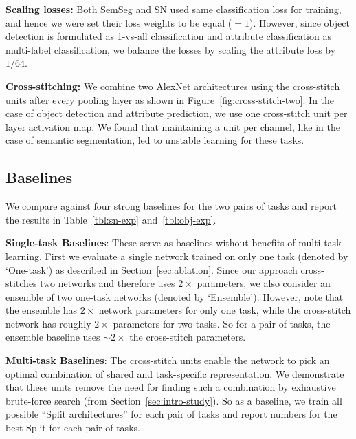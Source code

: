 \documentclass[10pt,twocolumn,letterpaper]{article}
\begin{document}
\par \noindent \textbf{Scaling losses:} Both SemSeg and SN used same classification loss for training, and hence we were set their loss weights to be equal ($=1$). However, since object detection is formulated as 1-vs-all classification and attribute classification as multi-label classification, we balance the losses by scaling the attribute loss by $1/64$. 


\par \noindent \textbf{Cross-stitching:} We combine two AlexNet architectures using the cross-stitch units after every pooling layer as shown in Figure~\ref{fig:cross-stitch-two}. In the case of object detection and attribute prediction, we use one cross-stitch unit per layer activation map. We found that maintaining a unit per channel, like in the case of semantic segmentation, led to unstable learning for these tasks. 

\subsection{Baselines}
We compare against four strong baselines for the two pairs of tasks and report the results in Table~\ref{tbl:sn-exp} and~\ref{tbl:obj-exp}.

\par \noindent \textbf{Single-task Baselines}: These serve as baselines without benefits of multi-task learning. First we evaluate a single network trained on only one task (denoted by `One-task') as described in Section~\ref{sec:ablation}. Since our approach cross-stitches two networks and therefore uses $2\times$ parameters, we also consider an ensemble of two one-task networks (denoted by `Ensemble'). However, note that the ensemble has $2\times$ network parameters for only one task, while the cross-stitch network has roughly $2\times$ parameters for two tasks. So for a pair of tasks, the ensemble baseline uses $\sim2\times$ the cross-stitch parameters.

\par \noindent \textbf{Multi-task Baselines}: The cross-stitch units enable the network to pick an optimal combination of shared and task-specific representation. We demonstrate that these units remove the need for finding such a combination by exhaustive brute-force search (from Section~\ref{sec:intro-study}). So as a baseline, we train all possible ``Split architectures'' for each pair of tasks and report numbers for the best Split for each pair of tasks.
\end{document}
